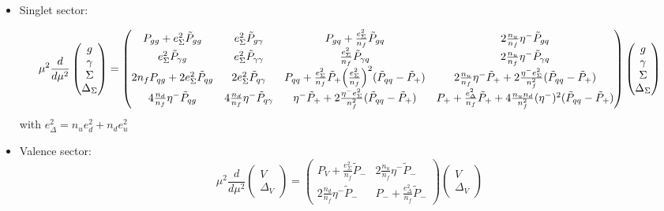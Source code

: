 \documentclass[a4paper,twoside]{article}
\title{}
\author{}
\date{}
\begin{document}
\maketitle
\begin{itemize}
\item Singlet sector:

\begin{equation*}
\mu^2\frac{d}{d\mu^2}
\begin{pmatrix}
g \\
\gamma \\
\Sigma \\
\Delta_\Sigma
\end{pmatrix}
=
\begin{pmatrix}
 P_{gg}+e_\Sigma^2 \tilde{P}_{gg} & e_\Sigma^2 \tilde{P}_{g\gamma} & P_{gq} + \frac{e_\Sigma^2}{n_f}\tilde{P}_{gq} & 2\frac{n_u}{n_f}\eta^- \tilde{P}_{gq} \\
 e_\Sigma^2 \tilde{P}_{\gamma g} & e_\Sigma^2 \tilde{P}_{\gamma \gamma} & \frac{e_\Sigma^2}{n_f}\tilde{P}_{\gamma q} & 2\frac{n_u}{n_f}\eta^- \tilde{P}_{\gamma q} \\
 2n_f P_{qg} +2e_\Sigma^2  \tilde{P}_{qg} & 2 e_\Sigma^2  \tilde{P}_{q\gamma} & P_{qq}+ \frac{e_\Sigma^2}{n_f}\tilde{P}_{+}  \Bigl(\frac{e_\Sigma^2}{n_f}\Bigr)^2(\tilde{P}_{qq}-\tilde{P}_{+}) & 2\frac{n_u}{n_f}\eta^-\tilde{P}_{+}+2\frac{\eta^-e_\Sigma^2}{n_f^2}(\tilde{P}_{qq}-\tilde{P}_{+}) \\
 4\frac{n_d}{n_f}\eta^-\tilde{P}_{qg} & 4\frac{n_d}{n_f}\eta^-\tilde{P}_{q\gamma} & \eta^- \tilde{P}_{+} +2\frac{\eta^-e_\Sigma^2}{n_f^2}(\tilde{P}_{qq}-\tilde{P}_{+}) & P_+ +\frac{e_\Delta^2}{n_f}\tilde{P}_{+} +4\frac{n_u n_d}{n_f^2}(\eta^-)^2(\tilde{P}_{qq}-\tilde{P}_{+})
\end{pmatrix}
\begin{pmatrix}
g \\
\gamma \\
\Sigma \\
\Delta_\Sigma
\end{pmatrix}
\end{equation*}
with $e_\Delta^2=n_u e_d^2+n_d e_u^2$

\item Valence sector:
\begin{equation*}
\mu^2\frac{d}{d\mu^2}
\begin{pmatrix}
V \\
\Delta_V
\end{pmatrix}
=
\begin{pmatrix}
P_V+\frac{e_\Sigma^2}{n_f} \tilde{P}_{-} & 2\frac{n_u}{n_f}\eta^- \tilde{P}_{-}\\
 2\frac{n_d}{n_f}\eta^- \tilde{P}_{-}& P_-+\frac{e_\Delta^2}{n_f} \tilde{P}_{-}
\end{pmatrix}
\begin{pmatrix}
V \\
\Delta_V
\end{pmatrix}
\end{equation*}


\end{itemize}
\end{document}
